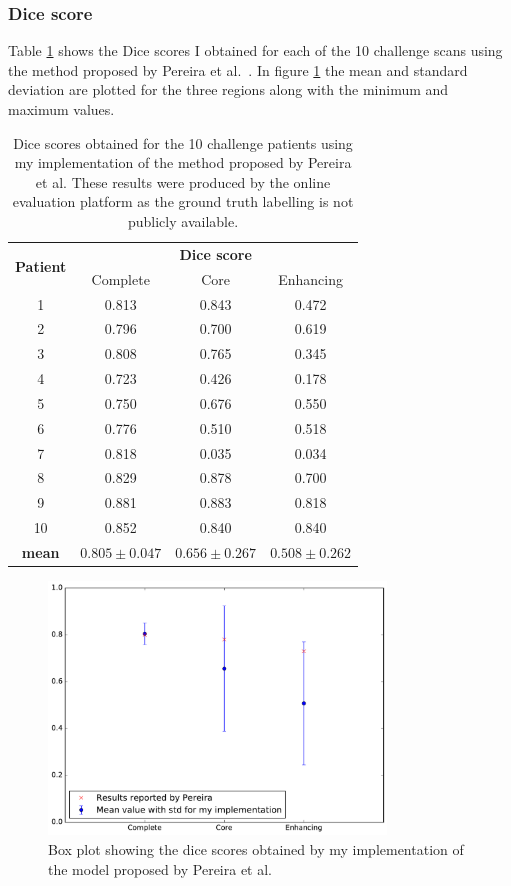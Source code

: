 \documentclass[12pt,a4paper,twoside,openright]{report}
\newlength\figureheight
\newlength\figurewidth
\begin{document}
\subsubsection{Dice score}
Table \ref{table:pereira_dice_results} shows the Dice scores I obtained for each of the 10 challenge scans using the method proposed by Pereira et al.\ \cite{pereira}. In figure \ref{pereira_box_plot} the mean and standard deviation are plotted for the three regions along with the minimum and maximum values. \begin{table}
\centering	
\begin{tabular}{ c | c c c} 
\multirow{2}{*}{\textbf{Patient}} & \multicolumn{3}{c}{\textbf{Dice score}} \\
 & Complete & Core & Enhancing \\
 \hline
1 & 0.813 & 0.843 & 0.472 \\
2 & 0.796 & 0.700 & 0.619 \\
3 & 0.808 & 0.765 & 0.345 \\
4 & 0.723 & 0.426 & 0.178 \\
5 & 0.750 & 0.676 & 0.550 \\
6 & 0.776 & 0.510 & 0.518 \\
7 & 0.818 & 0.035 & 0.034 \\
8 & 0.829 & 0.878 & 0.700 \\
9 & 0.881 & 0.883 & 0.818 \\
10 & 0.852 & 0.840 & 0.840 \\
\hline
\rule{0pt}{3ex}    
\textbf{mean} & $0.805 \pm 0.047$ & $0.656 \pm 0.267$ & $0.508 \pm 0.262$
\end{tabular}
\caption{Dice scores obtained for the 10 challenge patients using my implementation of the method proposed by Pereira et al. These results were produced by the online evaluation platform as the ground truth labelling is not publicly available.}
\label{table:pereira_dice_results}
\end{table}

\begin{figure}
	\centering
%	
	\includegraphics[width=0.8\textwidth]{plots/pereira_box_plot2}
	\caption{Box plot showing the dice scores obtained by my implementation of the model proposed by Pereira et al.}
	\label{pereira_box_plot}
\end{figure}
\end{document}
